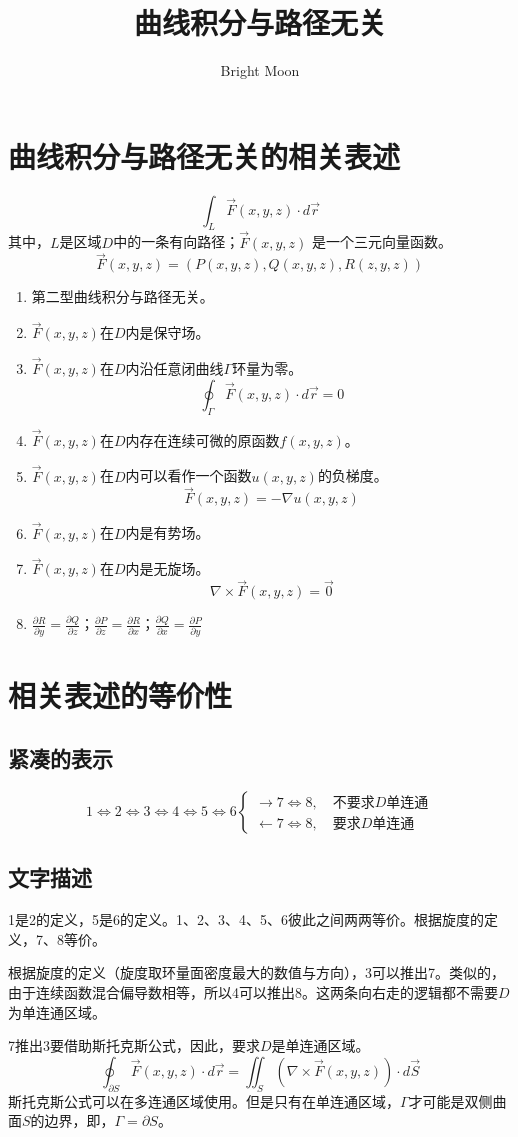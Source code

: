 \documentclass[UTF8]{ctexart}
\title{曲线积分与路径无关}
\author{Bright Moon}
\begin{document}
\maketitle
\section{曲线积分与路径无关的相关表述}
\[\int _L \vec F(x,y,z) \cdot d\vec r\]
其中，$L$是区域$D$中的一条有向路径；$\vec F(x,y,z)$ 是一个三元向量函数。
\[\vec F(x,y,z) = (P(x,y,z),Q(x,y,z),R(z,y,z))\]
\begin{enumerate}
    \item 第二型曲线积分与路径无关。
    \item $\vec F(x,y,z)$在$D$内是保守场。
    \item $\vec F(x,y,z)$在$D$内沿任意闭曲线$\Gamma$环量为零。\[\oint _{\Gamma} \vec F(x,y,z)\cdot d\vec r = 0\]
    \item $\vec F(x,y,z)$在$D$内存在连续可微的原函数$f(x,y,z)$。
    \item $\vec F(x,y,z)$在$D$内可以看作一个函数$u(x,y,z)$的负梯度。\[\vec F(x,y,z) = -\nabla u(x,y,z)\]
    \item $\vec F(x,y,z)$在$D$内是有势场。
    \item $\vec F(x,y,z)$在$D$内是无旋场。\[\nabla \times \vec F(x,y,z) = \vec 0\]
    \item 
        $\frac{\partial R}{\partial y}=\frac{\partial Q}{\partial z}$；$\frac{\partial P}{\partial z}=\frac{\partial R}{\partial x}$；$\frac{\partial Q}{\partial x}=\frac{\partial P}{\partial y}$
\end{enumerate}
\section{相关表述的等价性}
\subsection{紧凑的表示}
\begin{equation}
    1\Leftrightarrow 2\Leftrightarrow 3\Leftrightarrow 4\Leftrightarrow 5\Leftrightarrow 6\begin{cases}
    \longrightarrow 7\Leftrightarrow 8,\quad \text{不要求$D$单连通}\\
    \longleftarrow 7\Leftrightarrow 8,\quad \text{要求$D$单连通}
    \end{cases}
\end{equation}
\subsection{文字描述}
1是2的定义，5是6的定义。1、2、3、4、5、6彼此之间两两等价。根据旋度的定义，7、8等价。
\par
根据旋度的定义（旋度取环量面密度最大的数值与方向），3可以推出7。类似的，由于连续函数混合偏导数相等，所以4可以推出8。这两条向右走的逻辑都不需要$D$为单连通区域。
\par
7推出3要借助斯托克斯公式，因此，要求$D$是单连通区域。
\[\oint _{\partial S} \vec F(x,y,z)\cdot d\vec r = \iint_S \left(\nabla \times \vec F(x,y,z) \right) \cdot d\vec S\]
斯托克斯公式可以在多连通区域使用。但是只有在单连通区域，$\Gamma$才可能是双侧曲面$S$的边界，即，$\Gamma = \partial S$。
\end{document}
